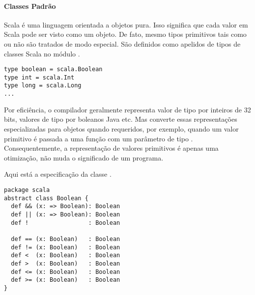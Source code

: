 \paragraph{Classes Padr\~{a}o}


Scala \'{e} uma linguagem orientada a objetos pura. Isso significa que cada valor 
em Scala pode ser visto como um objeto. De fato, mesmo tipos primitivos tais como 
 ou  n\~{a}o s\~{a}o tratados de modo especial. S\~{a}o definidos
como apelidos de tipos de classes Scala no m\'{o}dulo .  
\begin{lstlisting}
type boolean = scala.Boolean
type int = scala.Int
type long = scala.Long
...
\end{lstlisting}

Por efici\^{e}ncia, o compilador geralmente representa valor de tipo
 por inteiros de 32 bits, valores de tipo 
por boleanos Java etc. Mas converte essas representa\c{c}\~{o}es especializadas para 
objetos quando requeridos, por exemplo, quando um valor primitivo  \'{e} 
passada a uma fun\c{c}\~{a}o com um par\^{a}metro de tipo . Consequentemente, a
representa\c{c}\~{a}o de valores primitivos \'{e} apenas uma otimiza\c{c}\~{a}o, n\~{a}o muda o significado
de um programa.

Aqui est\'{a} a especifica\c{c}\~{a}o da classe .
\begin{lstlisting}
package scala
abstract class Boolean {
  def && (x: => Boolean): Boolean
  def || (x: => Boolean): Boolean
  def !                 : Boolean

  def == (x: Boolean)   : Boolean
  def != (x: Boolean)   : Boolean
  def <  (x: Boolean)   : Boolean
  def >  (x: Boolean)   : Boolean
  def <= (x: Boolean)   : Boolean
  def >= (x: Boolean)   : Boolean
}
\end{lstlisting}

